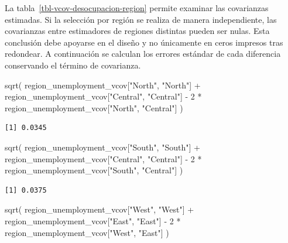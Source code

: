 \documentclass[
  spanish,
  11pt,
  letterpaper,
  oneside,
  open=any]{scrbook}
\newenvironment{Shaded}{\begin{snugshade}}{\end{snugshade}}
\newcommand{\DecValTok}[1]{\textcolor[rgb]{0.68,0.00,0.00}{#1}}
\newcommand{\FunctionTok}[1]{\textcolor[rgb]{0.28,0.35,0.67}{#1}}
\newcommand{\NormalTok}[1]{\textcolor[rgb]{0.00,0.23,0.31}{#1}}
\newcommand{\SpecialCharTok}[1]{\textcolor[rgb]{0.37,0.37,0.37}{#1}}
\newcommand{\StringTok}[1]{\textcolor[rgb]{0.13,0.47,0.30}{#1}}
\begin{document}
La tabla~\ref{tbl-vcov-desocupacion-region} permite examinar las
covarianzas estimadas. Si la selección por región se realiza de manera
independiente, las covarianzas entre estimadores de regiones distintas
pueden ser nulas. Esta conclusión debe apoyarse en el diseño y no
únicamente en ceros impresos tras redondear. A continuación se calculan
los errores estándar de cada diferencia conservando el término de
covarianza.

\begin{Shaded}
\begin{Highlighting}[]
\FunctionTok{sqrt}\NormalTok{(}
\NormalTok{  region\_unemployment\_vcov[}\StringTok{"North"}\NormalTok{, }\StringTok{"North"}\NormalTok{] }\SpecialCharTok{+}
\NormalTok{    region\_unemployment\_vcov[}\StringTok{"Central"}\NormalTok{, }\StringTok{"Central"}\NormalTok{] }\SpecialCharTok{{-}}
    \DecValTok{2} \SpecialCharTok{*}\NormalTok{ region\_unemployment\_vcov[}\StringTok{"North"}\NormalTok{, }\StringTok{"Central"}\NormalTok{]}
\NormalTok{)}
\end{Highlighting}
\end{Shaded}

\begin{verbatim}
[1] 0.0345
\end{verbatim}

\begin{Shaded}
\begin{Highlighting}[]
\FunctionTok{sqrt}\NormalTok{(}
\NormalTok{  region\_unemployment\_vcov[}\StringTok{"South"}\NormalTok{, }\StringTok{"South"}\NormalTok{] }\SpecialCharTok{+}
\NormalTok{    region\_unemployment\_vcov[}\StringTok{"Central"}\NormalTok{, }\StringTok{"Central"}\NormalTok{] }\SpecialCharTok{{-}}
    \DecValTok{2} \SpecialCharTok{*}\NormalTok{ region\_unemployment\_vcov[}\StringTok{"South"}\NormalTok{, }\StringTok{"Central"}\NormalTok{]}
\NormalTok{)}
\end{Highlighting}
\end{Shaded}

\begin{verbatim}
[1] 0.0375
\end{verbatim}

\begin{Shaded}
\begin{Highlighting}[]
\FunctionTok{sqrt}\NormalTok{(}
\NormalTok{  region\_unemployment\_vcov[}\StringTok{"West"}\NormalTok{, }\StringTok{"West"}\NormalTok{] }\SpecialCharTok{+}
\NormalTok{    region\_unemployment\_vcov[}\StringTok{"East"}\NormalTok{, }\StringTok{"East"}\NormalTok{] }\SpecialCharTok{{-}}
    \DecValTok{2} \SpecialCharTok{*}\NormalTok{ region\_unemployment\_vcov[}\StringTok{"West"}\NormalTok{, }\StringTok{"East"}\NormalTok{]}
\NormalTok{)}
\end{Highlighting}
\end{Shaded}
\end{document}
